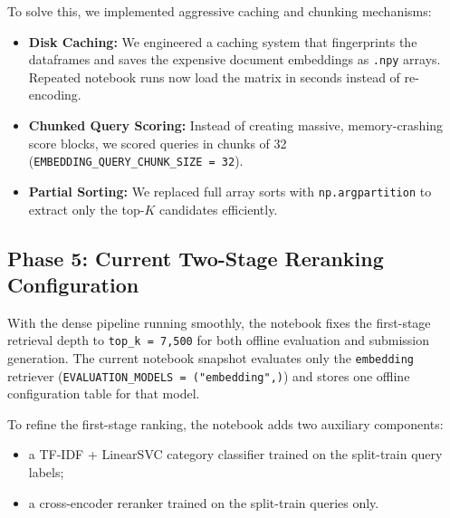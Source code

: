 \documentclass[11pt,a4paper]{article}
\begin{document}
To solve this, we implemented aggressive caching and chunking mechanisms:
\begin{itemize}
    \item \textbf{Disk Caching:} We engineered a caching system that fingerprints the dataframes and saves the expensive document embeddings as \texttt{.npy} arrays. Repeated notebook runs now load the matrix in seconds instead of re-encoding.
    \item \textbf{Chunked Query Scoring:} Instead of creating massive, memory-crashing score blocks, we scored queries in chunks of 32 (\texttt{EMBEDDING\_QUERY\_CHUNK\_SIZE = 32}).
    \item \textbf{Partial Sorting:} We replaced full array sorts with \texttt{np.argpartition} to extract only the top-$K$ candidates efficiently.
\end{itemize}

\subsection{Phase 5: Current Two-Stage Reranking Configuration}
With the dense pipeline running smoothly, the notebook fixes the first-stage retrieval depth to \texttt{top\_k = 7,500} for both offline evaluation and submission generation. The current notebook snapshot evaluates only the \texttt{embedding} retriever (\texttt{EVALUATION\_MODELS = ("embedding",)}) and stores one offline configuration table for that model.

To refine the first-stage ranking, the notebook adds two auxiliary components:
\begin{itemize}
    \item a TF-IDF + LinearSVC category classifier trained on the split-train query labels;
    \item a cross-encoder reranker trained on the split-train queries only.
\end{itemize}
\end{document}
